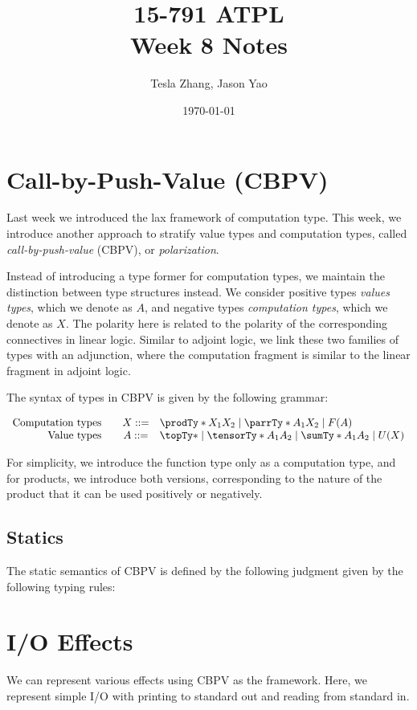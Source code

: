 \documentclass[letterpaper]{article}
\title{15-791 ATPL \\ Week 8 Notes}
\author{Tesla Zhang, Jason Yao}
\date{\today}
\begin{document}
\maketitle

\section{Call-by-Push-Value (CBPV)}
Last week we introduced the lax framework of computation type.
This week, we introduce another approach to stratify value types and computation types,
called \emph{call-by-push-value} (CBPV), or \emph{polarization}.

Instead of introducing a type former for computation types,
we maintain the distinction between type structures instead.
We consider positive types \emph{values types}, which we denote as $A$,
and negative types \emph{computation types}, which we denote as $X$.
The polarity here is related to the polarity of the corresponding connectives in linear logic.
Similar to adjoint logic, we link these two families of types with an adjunction,
where the computation fragment is similar to the linear fragment in adjoint logic.

The syntax of types in CBPV is given by the following grammar:

\[
    \begin{array}{rcl}
        \text{Computation types} \quad & X ::= & \prodTy*{X_1}{X_2} \mid \parrTy*{A_1}{X_2} \mid F(A) \\
        \text{Value types} \quad       & A ::= & \topTy* \mid \tensorTy*{A_1}{A_2} \mid \sumTy*{A_1}{A_2} \mid U(X) \\
    \end{array}
\]

For simplicity, we introduce the function type only as a computation type,
and for products, we introduce both versions, corresponding to the nature of the product that
it can be used positively or negatively.

\subsection{Statics}

The static semantics of CBPV is defined by the following judgment given by the following typing rules:

\begin{mathpar}
\end{mathpar}

\section{I/O Effects}
We can represent various effects using CBPV as the framework. Here, we represent simple I/O with printing to standard out and reading from standard in.
\end{document}
